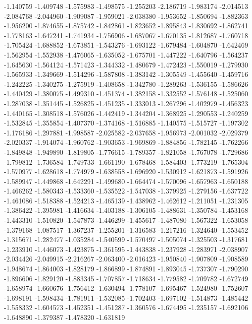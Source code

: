 -1.140759
-1.409748
-1.575983
-1.498575
-1.255203
-2.186719
-1.983174
-2.014513
-2.084768
-2.044960
-1.909087
-1.959021
-2.038380
-1.953652
-1.850694
-1.882363
-1.956200
-1.874655
-1.875742
-1.842861
-1.823652
-1.895843
-1.830692
-1.862741
-1.778163
-1.647241
-1.741934
-1.756906
-1.687067
-1.670135
-1.812687
-1.760718
-1.705424
-1.688852
-1.673851
-1.543276
-1.693122
-1.679484
-1.604870
-1.642469
-1.562954
-1.552938
-1.476065
-1.635052
-1.675701
-1.447222
-1.640796
-1.564237
-1.645630
-1.564124
-1.571423
-1.344332
-1.480679
-1.472423
-1.550019
-1.279930
-1.565933
-1.349669
-1.514296
-1.587808
-1.383142
-1.305549
-1.455640
-1.459716
-1.242225
-1.340275
-1.275919
-1.408658
-1.342780
-1.289263
-1.536155
-1.586626
-1.440429
-1.380075
-1.499310
-1.451374
-1.382158
-1.332552
-1.576148
-1.525060
-1.287038
-1.351445
-1.526825
-1.451235
-1.333013
-1.267296
-1.402979
-1.456323
-1.440165
-1.308518
-1.576026
-1.442419
-1.344204
-1.368925
-1.290553
-1.240259
-1.532845
-1.355854
-1.407370
-1.374168
-1.516885
-1.140575
-1.515727
-1.197302
-1.176186
-1.297881
-1.998587
-2.025582
-2.037658
-1.956973
-2.001032
-2.029379
-2.020337
-1.914074
-1.960762
-1.903653
-1.969869
-1.884856
-1.782145
-1.762266
-1.849848
-1.949890
-1.819805
-1.776615
-1.789357
-1.821058
-1.767078
-1.729686
-1.799812
-1.736584
-1.749733
-1.661190
-1.678468
-1.584403
-1.773219
-1.765304
-1.570977
-1.628618
-1.774979
-1.638558
-1.696920
-1.530912
-1.621873
-1.591926
-1.589947
-1.449868
-1.642291
-1.499680
-1.664474
-1.570096
-1.657963
-1.650188
-1.466262
-1.580343
-1.533360
-1.535522
-1.547038
-1.379925
-1.279156
-1.637722
-1.461086
-1.518388
-1.524213
-1.465139
-1.438962
-1.462612
-1.211051
-1.231305
-1.386422
-1.395981
-1.416634
-1.403188
-1.306105
-1.488631
-1.350784
-1.453168
-1.443310
-1.510820
-1.547873
-1.446299
-1.455617
-1.487080
-1.567322
-1.653058
-1.379168
-1.087517
-1.367237
-1.255201
-1.316583
-1.217216
-1.324640
-1.553452
-1.315671
-1.282477
-1.035284
-1.540599
-1.570497
-1.505074
-1.325503
-1.317681
-1.233910
-1.446073
-1.423875
-1.361595
-1.443838
-1.237928
-1.283971
-2.038907
-2.034426
-2.049915
-2.216267
-2.063400
-2.016423
-1.950840
-1.907809
-1.908589
-1.948674
-1.864003
-1.828179
-1.866899
-1.874891
-1.893045
-1.737307
-1.790290
-1.896606
-1.829120
-1.883345
-1.707857
-1.718634
-1.779582
-1.709782
-1.672749
-1.658974
-1.660676
-1.756412
-1.630494
-1.778107
-1.695467
-1.524980
-1.752607
-1.698191
-1.598434
-1.781911
-1.532085
-1.702403
-1.697102
-1.514873
-1.485442
-1.558332
-1.604573
-1.452351
-1.451287
-1.360576
-1.674495
-1.235157
-1.692106
-1.648890
-1.379387
-1.478320
-1.631819
